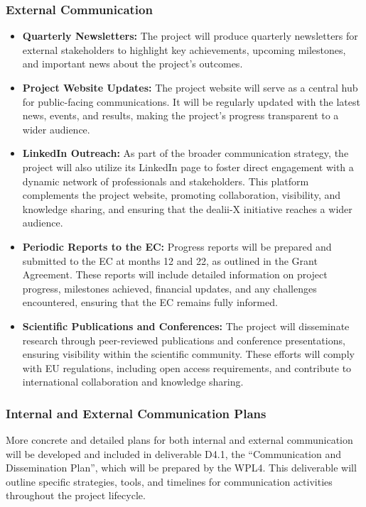 \documentclass[a4paper,12pt]{article}
\begin{document}
\subsubsection*{External Communication}
\begin{itemize}[left=2em, itemsep=1pt, topsep=0pt] 
    \item \textbf{Quarterly Newsletters:} The project will produce quarterly newsletters for external stakeholders to highlight key achievements, upcoming milestones, and important news about the project’s outcomes.
    \item \textbf{Project Website Updates:} The project website will serve as a central hub for public-facing communications. It will be regularly updated with the latest news, events, and results, making the project’s progress transparent to a wider audience.
    \item \textbf{LinkedIn Outreach:} As part of the broader communication strategy, the project will also utilize its LinkedIn page to foster direct engagement with a dynamic network of professionals and stakeholders. This platform complements the project website, promoting collaboration, visibility, and knowledge sharing, and ensuring that the dealii-X initiative reaches a wider audience.
    \item \textbf{Periodic Reports to the EC:} Progress reports will be prepared and submitted to the EC at months 12 and 22, as outlined in the Grant Agreement. These reports will include detailed information on project progress, milestones achieved, financial updates, and any challenges encountered, ensuring that the EC remains fully informed.
    \item \textbf{Scientific Publications and Conferences:} The project will disseminate research through peer-reviewed publications and conference presentations, ensuring visibility within the scientific community. These efforts will comply with EU regulations, including open access requirements, and contribute to international collaboration and knowledge sharing.
\end{itemize}

\subsubsection*{Internal and External Communication Plans}
More concrete and detailed plans for both internal and external communication will be developed and included in deliverable D4.1, the ``Communication and Dissemination Plan'', which will be prepared by the WPL4. This deliverable will outline specific strategies, tools, and timelines for communication activities throughout the project lifecycle.
\end{document}
